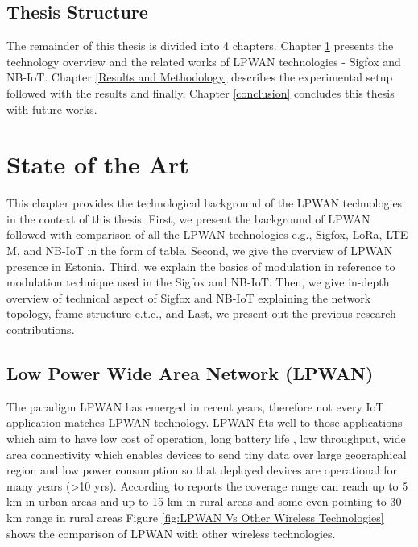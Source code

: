 \documentclass[12pt]{article}
\begin{document}
\subsection{Thesis Structure}
The remainder of this thesis is divided into 4 chapters. Chapter \ref{State of the Art} presents the technology overview and the related works of LPWAN technologies - Sigfox and NB-IoT. Chapter \ref{Results and Methodology} describes the experimental setup followed with the results and finally, Chapter \ref{conclusion} concludes this thesis with future works.

\newpage
\section{State of the Art}\label{State of the Art}
This chapter provides the technological background of the LPWAN technologies in the context of this thesis. First, we present the background of LPWAN followed with comparison of all the LPWAN technologies e.g., Sigfox, LoRa, LTE-M, and NB-IoT  in the form of table. Second, we give the overview of LPWAN presence in Estonia. Third, we explain the basics of modulation in reference to modulation technique used in the Sigfox and NB-IoT. Then, we give in-depth overview of technical aspect of Sigfox and NB-IoT explaining the network topology, frame structure e.t.c., and Last, we present out the previous research contributions.

\subsection{Low Power Wide Area Network (LPWAN)}

The paradigm LPWAN has emerged in recent years, therefore not every IoT application matches LPWAN technology. LPWAN fits well to those applications which aim to have low cost of operation, long battery life , low throughput, wide area connectivity which enables devices to send tiny data over large geographical region and low power consumption so that deployed devices are operational for many years (>10 yrs). According to reports the coverage range can reach up to 5 km in urban areas and up to 15 km in rural areas \cite{centenaro2016long} and some even pointing to 30 km range in rural areas \cite{petajajarvi2016evaluation} Figure \ref{fig:LPWAN Vs Other Wireless Technologies} shows the comparison of LPWAN with other wireless technologies.
\end{document}
